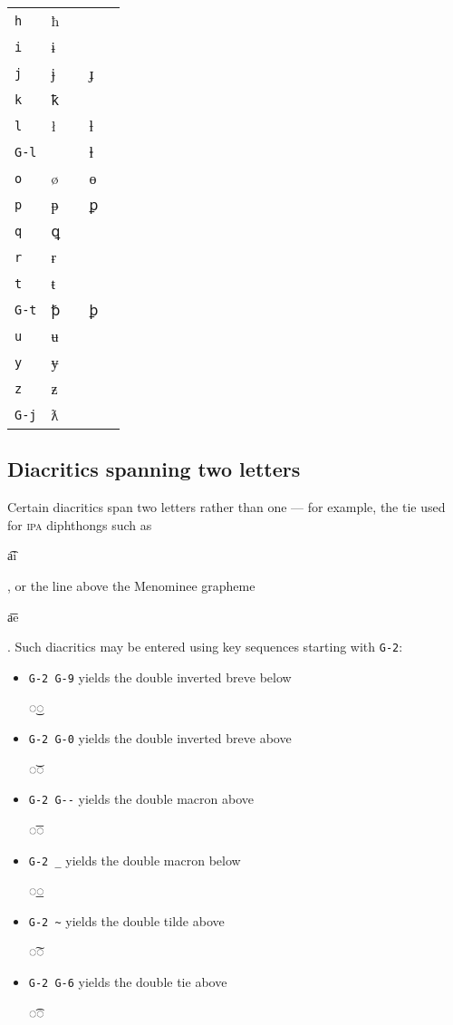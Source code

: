 \documentclass[oneside]{memoir}
\newcommand{\cmark}{\ding{51}}
\newcommand{\xmark}{\ding{55}}
\newcommand{\key}{\verb}
\newcommand{\out}[1]{\colorbox{gray!20}{\strut{}#1}}
\begin{document}
{\begin{table}[!b]
\begin{minipage}{0.55\paperwidth}
\begin{tabular}{lllll}
\key|h|   & ħ & \cmark &   & \\
\key|i|   & ɨ & \cmark &   & \\
\key|j|   & ɉ & \cmark & ɟ & \xmark \\
\key|k|   & ꝁ & \cmark &   & \\
\key|l|   & ł & \cmark & ƚ & \cmark \\
\key|G-l| &   &        & ⱡ & \cmark \\
\key|o|   & ø & \cmark & ɵ & \cmark \\
\key|p|   & ᵽ & \cmark & ꝑ & \cmark \\
\key|q|   & ꝗ & \cmark &   & \\
\key|r|   & ɍ & \cmark &   & \\
\key|t|   & ŧ & \cmark &   & \\
\key|G-t| & ꝥ & \cmark & ꝧ & \cmark \\
\key|u|   & ʉ & \cmark &   & \\
\key|y|   & ɏ & \cmark &   & \\
\key|z|   & ƶ & \cmark &   & \\
\key|G-j| & ƛ & \xmark &   & \\
\bottomrule
\end{tabular}
\end{minipage}
\end{table}

\subsection{Diacritics spanning two letters}
\label{sec:diacritics_spanning_two_letters}

Certain diacritics span two letters rather than one --- for example, the tie used for \textsc{ipa} diphthongs such as \out{a͡i}, or the line above the Menominee grapheme \out{a͞e}.
Such diacritics may be entered using key sequences starting with \key|G-2|:

\begin{itemize}[noitemsep]
\item \key|G-2 G-9| yields the double inverted breve below \out{◌͜◌}
\item \key|G-2 G-0| yields the double inverted breve above \out{◌͝◌}
\item \key|G-2 G--| yields the double macron above \out{◌͞◌}
\item \key|G-2 _| yields the double macron below \out{◌͟◌}
\item \key|G-2 ~| yields the double tilde above \out{◌͠◌}
\item \key|G-2 G-6| yields the double tie above \out{◌͡◌}
\end{itemize}

}
\end{document}
